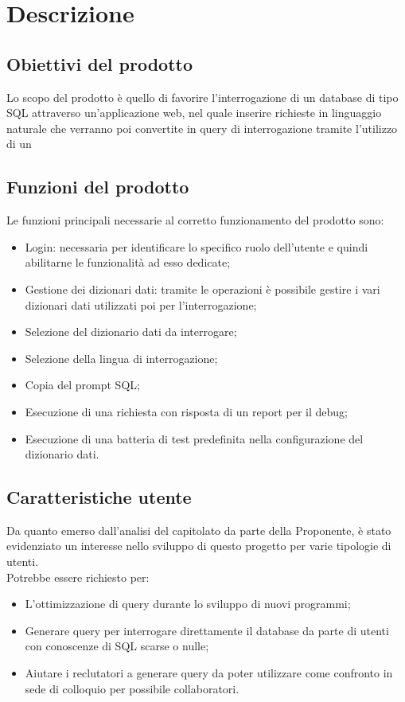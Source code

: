 \section{Descrizione}

\subsection{Obiettivi del prodotto}
Lo scopo del prodotto è quello di favorire l’interrogazione di un database di tipo SQL attraverso un’applicazione web, nel quale inserire richieste in linguaggio naturale che verranno poi convertite in query di interrogazione tramite l’utilizzo di un 

\subsection{Funzioni del prodotto}
Le funzioni principali necessarie al corretto funzionamento del prodotto sono:
\begin{itemize}
  \item Login: necessaria per identificare lo specifico ruolo dell’utente e quindi abilitarne le funzionalità ad esso dedicate;
  \item Gestione dei dizionari dati: tramite le operazioni  è possibile gestire i vari dizionari dati utilizzati poi per l’interrogazione;
  \item Selezione del dizionario dati da interrogare;
  \item Selezione della lingua di interrogazione;
  \item Copia del prompt SQL;
  \item Esecuzione di una richiesta con risposta di un report per il debug;
  \item Esecuzione di una batteria di test predefinita nella configurazione del dizionario dati.
\end{itemize}

\subsection{Caratteristiche utente}
Da quanto emerso dall’analisi del capitolato da parte della Proponente, è stato evidenziato un interesse nello sviluppo di questo progetto per varie tipologie di utenti.\\
Potrebbe essere richiesto per:
\begin{itemize}
  \item L'ottimizzazione di query durante lo sviluppo di nuovi programmi;
  \item Generare query per interrogare direttamente il database da parte di utenti con conoscenze di SQL scarse o nulle;
  \item Aiutare i reclutatori a generare query da poter utilizzare come confronto in sede di colloquio per possibile collaboratori.
\end{itemize}

